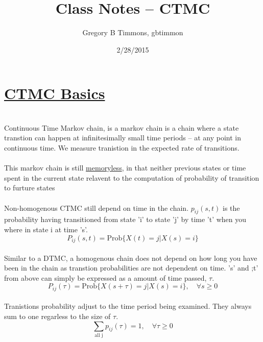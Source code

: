 \documentclass{article}
\begin{document}
	\title{Class Notes -- CTMC}
	\date{2/28/2015}
	\author{Gregory B Timmons, gbtimmon}
	\maketitle
\section*{\underline{CTMC Basics}} \\
 Continuous Time Markov chain, is a markov chain is a chain
where a state transtion can happen at infinitesimally small time periods -- at any
point in continuous time. We measure tranistion in the expected rate of
transitions.
\\
\\This markov chain is still \underline{memoryless}, in that neither previous
states or time spent in the current state relavent to the computation of
probability of transition to furture states
\\
\\Non-homogenous CTMC still depend on time in the chain.
\underline{$p_{ij}(s,t)$} is the probability having transitioned from state 'i' to state 'j' by time 't' when you
where in state i at time 's'.
\[P_{ij}(s,t) = \mbox{Prob}\{X(t) = j | X(s) = i\} \]
\\Similar to a DTMC, a homogenous chain does not depend on how long you have
been in the chain as transtion probabilities are not dependent on time. 's' and
;t' from above can simply be expressed as a amount of time passed, $\tau$.
\[P_{ij}(\tau) = \mbox{Prob}\{X(s + \tau) = j | X(s) = i\}, \quad \forall s \geq
0\]
\\
Tranistions probability adjust to the time period being examined. They always
sum to one regarless to the size of $\tau$.
\[\sum\limits_{\mbox{all j}}{p_{ij}(\tau) = 1, \quad \forall \tau \geq 0}\]
\end{document}

